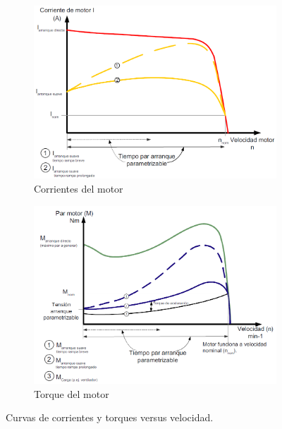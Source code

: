 \begin{figure}
	\centering
	\begin{subfigure}[b]{0.49\textwidth}
		\centering
		\includegraphics[width=\textwidth]{Imagenes/CorrienteMotor}
		\caption{Corrientes del motor}
		\label{fig:corrientemotor}
	\end{subfigure}
	\hfill
	\begin{subfigure}[b]{0.49\textwidth}
		\centering
		\includegraphics[width=\textwidth]{Imagenes/TorqueMotor}
		\caption{Torque del motor}
		\label{fig:torquemotor}
		
	\end{subfigure}
	\caption{Curvas de corrientes y torques versus velocidad.\cite{SIEMENS}}
\end{figure}



